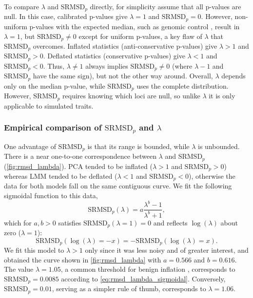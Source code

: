 \documentclass[11pt]{article}
\newcommand{\rmsd}{\text{SRMSD}_p}
\begin{document}
To compare $\lambda$ and $\rmsd$ directly, for simplicity assume that all p-values are null.
In this case, calibrated p-values give $\lambda = 1$ and $\rmsd = 0$.
However, non-uniform p-values with the expected median, such as genomic control \citep{devlin_genomic_1999}, result in $\lambda = 1$, but $\rmsd \ne 0$ except for uniform p-values, a key flaw of $\lambda$ that $\rmsd$ overcomes.
Inflated statistics (anti-conservative p-values) give $\lambda > 1$ and $\rmsd > 0$.
Deflated statistics (conservative p-values) give $\lambda < 1$ and $\rmsd < 0$.
Thus, $\lambda \ne 1$ always implies $\rmsd \ne 0$ (where $\lambda - 1$ and $\rmsd$ have the same sign), but not the other way around.
Overall, $\lambda$ depends only on the median p-value, while $\rmsd$ uses the complete distribution.
However, $\rmsd$ requires knowing which loci are null, so unlike $\lambda$ it is only applicable to simulated traits.

\subsubsection{Empirical comparison of $\rmsd$ and $\lambda$}

One advantage of $\rmsd$ is that its range is bounded, while $\lambda$ is unbounded.
There is a near one-to-one correspondence between $\lambda$ and $\rmsd$ (\cref{fig:rmsd_lambda}).
PCA tended to be inflated ($\lambda > 1$ and $\rmsd > 0$) whereas LMM tended to be deflated ($\lambda < 1$ and $\rmsd < 0$), otherwise the data for both models fall on the same contiguous curve.
We fit the following sigmoidal function to this data,
\begin{equation}
  \label{eq:rmsd_lambda_sigmoidal}
  \rmsd( \lambda ) = a \frac{ \lambda^b - 1 }{ \lambda^b + 1 },
\end{equation}
which for $a,b > 0$ satisfies $\rmsd( \lambda = 1 ) = 0$ and reflects $\log( \lambda )$ about zero ($\lambda = 1$):
$$
\rmsd( \log( \lambda ) = -x ) = - \rmsd( \log( \lambda ) = x ).
$$
We fit this model to $\lambda > 1$ only since it was less noisy and of greater interest, and obtained the curve shown in \cref{fig:rmsd_lambda} with $a = 0.566$ and $b = 0.616$.
The value $\lambda = 1.05$, a common threshold for benign inflation \citep{price_new_2010}, corresponds to $\rmsd = 0.0085$ according to \cref{eq:rmsd_lambda_sigmoidal}.
Conversely, $\rmsd = 0.01$, serving as a simpler rule of thumb, corresponds to $\lambda = 1.06$.
\end{document}
